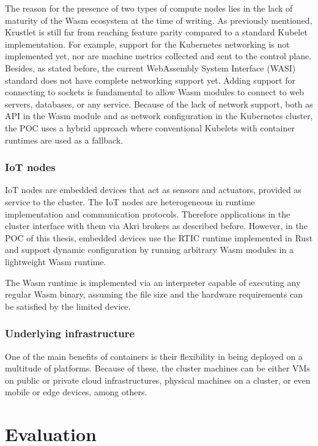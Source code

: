The reason for the presence of two types of compute nodes lies in the lack of maturity of the Wasm ecosystem at the time of writing. As previously mentioned, Krustlet is still far from reaching feature parity compared to a standard Kubelet implementation. For example, support for the Kubernetes networking is not implemented yet, nor are machine metrics collected and sent to the control plane. Besides, as stated before, the current WebAssembly System Interface (WASI) standard does not have complete networking support yet. Adding support for connecting to sockets is fundamental to allow Wasm modules to connect to web servers, databases, or any service. Because of the lack of network support, both as API in the Wasm module and as network configuration in the Kubernetes cluster, the POC uses a hybrid approach where conventional Kubelets with container runtimes are used as a fallback.

\subsubsection{IoT nodes}

IoT nodes are embedded devices that act as sensors and actuators, provided as service to the cluster. The IoT nodes are heterogeneous in runtime implementation and communication protocols. Therefore applications in the cluster interface with them via Akri brokers as described before. However, in the POC of this thesis, embedded devices use the RTIC runtime implemented in Rust and support dynamic configuration by running arbitrary Wasm modules in a lightweight Wasm runtime.

The Wasm runtime is implemented via an interpreter capable of executing any regular Wasm binary, assuming the file size and the hardware requirements can be satisfied by the limited device.

\subsubsection{Underlying infrastructure}

One of the main benefits of containers is their flexibility in being deployed on a multitude of platforms. Because of these, the cluster machines can be either VMs on public or private cloud infrastructures, physical machines on a cluster, or even mobile or edge devices, among others.

\section{Evaluation}
\label{sec:evaluation}

